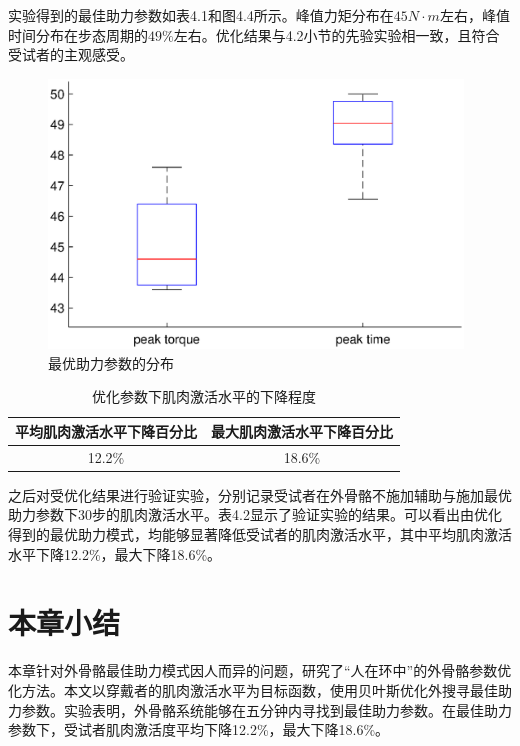 实验得到的最佳助力参数如表4.1和图4.4所示。峰值力矩分布在$45N\cdot m$左右，峰值时间分布在步态周期的$49\%$左右。优化结果与4.2小节的先验实验相一致，且符合受试者的主观感受。
\begin{figure}[htb]
    \includegraphics[width=11cm]{fig/f64.eps}
    \caption{最优助力参数的分布}
    \label{fig:mark}
\end{figure}
\begin{table}[!htb]
    \caption[控制参数]{优化参数下肌肉激活水平的下降程度}
    \begin{tabular}{cc}
      \toprule
      平均肌肉激活水平下降百分比 & 最大肌肉激活水平下降百分比 \\
      \midrule
        12.2\% & 18.6\% \\
      \bottomrule
    \end{tabular}
\end{table}

之后对受优化结果进行验证实验，分别记录受试者在外骨骼不施加辅助与施加最优助力参数下30步的肌肉激活水平。表4.2显示了验证实验的结果。可以看出由优化得到的最优助力模式，均能够显著降低受试者的肌肉激活水平，其中平均肌肉激活水平下降12.2\%，最大下降18.6\%。

\section{本章小结}

本章针对外骨骼最佳助力模式因人而异的问题，研究了“人在环中”的外骨骼参数优化方法。本文以穿戴者的肌肉激活水平为目标函数，使用贝叶斯优化外搜寻最佳助力参数。实验表明，外骨骼系统能够在五分钟内寻找到最佳助力参数。在最佳助力参数下，受试者肌肉激活度平均下降12.2\%，最大下降18.6\%。